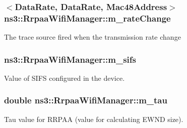 \subsubsection[{\texorpdfstring{m\+\_\+rate\+Change}{m_rateChange}}]{$<${\bf Data\+Rate}, {\bf Data\+Rate}, {\bf Mac48\+Address}$>$ ns3\+::\+Rrpaa\+Wifi\+Manager\+::m\+\_\+rate\+Change\hspace{0.3cm}{\ttfamily [private]}}\hypertarget{classns3_1_1RrpaaWifiManager_a8036ec80b5e8683768e0081ed8f52100}{}\label{classns3_1_1RrpaaWifiManager_a8036ec80b5e8683768e0081ed8f52100}
The trace source fired when the transmission rate change 
\subsubsection[{\texorpdfstring{m\+\_\+sifs}{m_sifs}}]{ ns3\+::\+Rrpaa\+Wifi\+Manager\+::m\+\_\+sifs\hspace{0.3cm}{\ttfamily [private]}}\hypertarget{classns3_1_1RrpaaWifiManager_a023045edc295b2835d5d820b2a447978}{}\label{classns3_1_1RrpaaWifiManager_a023045edc295b2835d5d820b2a447978}


Value of S\+I\+FS configured in the device. 

\subsubsection[{\texorpdfstring{m\+\_\+tau}{m_tau}}]{\setlength{\rightskip}{0pt plus 5cm}double ns3\+::\+Rrpaa\+Wifi\+Manager\+::m\+\_\+tau\hspace{0.3cm}{\ttfamily [private]}}\hypertarget{classns3_1_1RrpaaWifiManager_aa92c842dd6d783f3ebf0c0fbcf6984d3}{}\label{classns3_1_1RrpaaWifiManager_aa92c842dd6d783f3ebf0c0fbcf6984d3}


Tau value for R\+R\+P\+AA (value for calculating E\+W\+ND size). 

